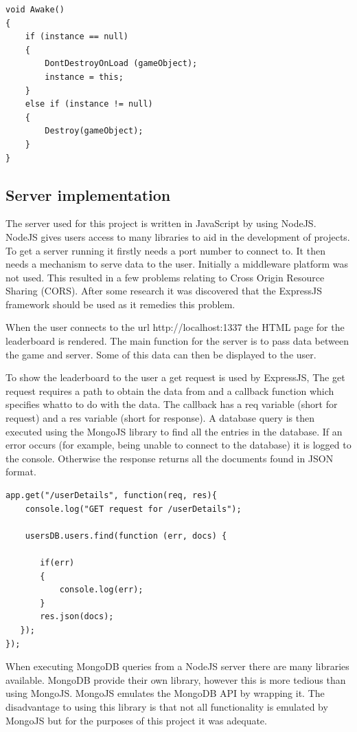 \documentclass[12pt]{article}
\begin{document}
\begin{lstlisting}
void Awake()
{
	if (instance == null) 
	{
		DontDestroyOnLoad (gameObject);
		instance = this;
	} 
	else if (instance != null) 
	{
		Destroy(gameObject);
	}
}
\end{lstlisting}

\subsection{Server implementation}
The server used for this project is written in JavaScript by using NodeJS. NodeJS gives users access to many libraries to aid in the development of projects. To get a server running it firstly needs a port number to connect to. It then needs a mechanism to serve data to the user. Initially a middleware platform was not used. This resulted in a few problems relating to Cross Origin Resource Sharing (CORS). After some research it was discovered that the ExpressJS framework should be used as it remedies this problem. 

When the user connects to the url http://localhost:1337 the HTML page for the leaderboard is rendered. The main function for the server is to pass data between the game and server. Some of this data can then be displayed to the user. 

To show the leaderboard to the user a get request is used by ExpressJS, The get request requires a path to obtain the data from and a callback function which specifies whatto to do with the data. The callback has a req variable (short for request) and a res variable (short for response). A database query is then executed using the MongoJS library to find all the entries in the database. If an error occurs (for example, being unable to connect to the database) it is logged to the console. Otherwise the response returns all the documents found in JSON format. 

\begin{lstlisting}
app.get("/userDetails", function(req, res){
    console.log("GET request for /userDetails");

    usersDB.users.find(function (err, docs) {

       if(err)
       {
           console.log(err);
       }
       res.json(docs);
   });
});
\end{lstlisting}

When executing MongoDB queries from a NodeJS server there are many libraries available. MongoDB provide their own library, however this is more tedious than using MongoJS. MongoJS emulates the MongoDB API by wrapping it. The disadvantage to using this library is that not all functionality is emulated by MongoJS but for the purposes of this project it was adequate. 
\end{document}
